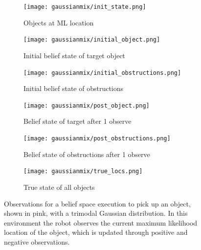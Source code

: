 \begin{figure}
  \centering
  \begin{subfigure}[b]{0.3\linewidth}
    \texttt{[image: gaussianmix/init\_state.png]}
    \caption{Objects at ML location}
    \label{fig:step1}
  \end{subfigure}
  \begin{subfigure}[b]{0.3\linewidth}
    \texttt{[image: gaussianmix/initial\_object.png]}
    \caption{Initial belief state of target object}
    \label{fig:step2}
  \end{subfigure}
  \begin{subfigure}[b]{0.3\linewidth}
    \texttt{[image: gaussianmix/initial\_obstructions.png]}
    \caption{Initial belief state of obstructions}
    \label{fig:step3}
  \end{subfigure}
  \begin{subfigure}[b]{0.3\linewidth}
    \texttt{[image: gaussianmix/post\_object.png]}
    \caption{Belief state of target after 1 observe}
    \label{fig:step4}
  \end{subfigure}
  \begin{subfigure}[b]{0.3\linewidth}
    \texttt{[image: gaussianmix/post\_obstructions.png]}
    \caption{Belief state of obstructions after 1 observe}
    \label{fig:step5}
  \end{subfigure}
  \begin{subfigure}[b]{0.3\linewidth}
    \texttt{[image: gaussianmix/true\_locs.png]}
    \caption{True state of all objects}
    \label{fig:step6}
  \end{subfigure}
  \caption{Observations for a belief space execution
    to pick up an object, shown in pink, with a trimodal Gaussian distribution.
    In this environment the robot observes the current maximum likelihood location
    of the object, which is updated through positive and negative observations.}
  \label{fig:experiment}
\end{figure}
